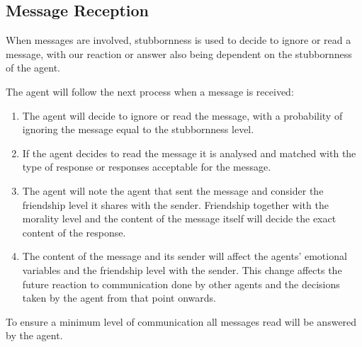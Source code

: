 \subsection{Message Reception}
When messages are involved, stubbornness is used to decide to ignore or read a message, with our reaction or answer also being dependent on the stubbornness of the agent. \par
The agent will follow the next process when a message is received:
\begin{enumerate}
    \item The agent will decide to ignore or read the message, with a probability of ignoring the message equal to the stubbornness level.
    \item If the agent decides to read the message it is analysed and matched with the type of response or responses acceptable for the message. 
    \item The agent will note the agent that sent the message and consider the friendship level it shares with the sender. Friendship together with the morality level and the content of the message itself will decide the exact content of the response.
    \item The content of the message and its sender will affect the agents’ emotional variables and the friendship level with the sender. This change affects the future reaction to communication done by other agents and the decisions taken by the agent from that point onwards. 
\end{enumerate}
To ensure a minimum level of communication all messages read will be answered by the agent. 

